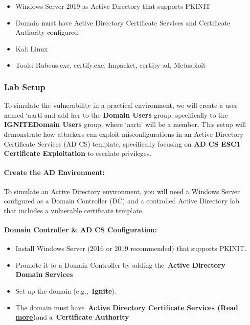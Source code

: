 \begin{itemize}
    \item Windows Server 2019 as Active Directory that supports PKINIT
    \item Domain must have Active Directory Certificate Services and Certificate Authority configured.
    \item Kali Linux
    \item Tools: Rubeus.exe, certify.exe, Impacket, certipy-ad, Metasploit
\end{itemize}

\subsubsection{Lab Setup}

To simulate the vulnerability in a practical environment, we will create a user named ‘aarti and add her to the \textbf{Domain Users} group, specifically to the \textbf{IGNITEDomain Users} group, where ‘aarti’ will be a member. This setup will demonstrate how attackers can exploit misconfigurations in an Active Directory Certificate Services (AD CS) template, specifically focusing on \textbf{AD CS ESC1 Certificate Exploitation} to escalate privileges.

\paragraph{Create the AD Environment:}

To simulate an Active Directory environment, you will need a Windows Server configured as a Domain Controller (DC) and a controlled Active Directory lab that includes a vulnerable certificate template.

\paragraph{Domain Controller \& AD CS Configuration:}

\begin{itemize}
    \item Install Windows Server (2016 or 2019 recommended) that supports PKINIT.
    \item Promote it to a Domain Controller by adding the \textbf{Active Directory Domain Services}
    \item Set up the domain (e.g., \textbf{Ignite}).
    \item The domain must have \textbf{Active Directory Certificate Services (}\href{https://www.hackingarticles.in/domain-persistence-golden-ticket-attack/}{\textbf{Read more}}\textbf{)}and a \textbf{Certificate Authority}
\end{itemize}

